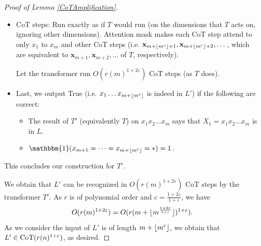 \documentclass{article}
\let\epsilon\varepsilon
\theoremstyle{definition}
\DeclarePairedDelimiter{\floor}{\lfloor}{\rfloor}
\newcommand{\x}{\mathbf{x}}
\newcommand{\0}{\mathbf{0}}
\newcommand{\CoT}{\mbox{\rm CoT}}
\newcommand{\1}{\mathbbm{1}}
\begin{document}
\begin{proof}[Proof of Lemma \ref{CoTAmplification}]
\begin{itemize}[noitemsep, leftmargin=10pt, topsep=0pt]
        \item CoT steps: Run exactly as if $T$ would run (on the dimensions that $T$ acts on, ignoring other dimensions). Attention mask makes each CoT step attend to only $x_1$ to $x_m$ and other CoT steps (i.e. $\x_{m+\floor{m^c}+1}, \x_{m+\floor{m^c}+2}, \dots$, which are equivalent to $\x_{m+1}, \x_{m+2}, \dots$ of $T$, respectively). 
        
        Let the transformer run $O(r(m)^{1 + 2 \epsilon})$ CoT steps (as $T$ does). 

        \item Last, we output True (i.e. $x_1 \dots x_{m + \floor{m^c}}$ is indeed in $L'$) if the following are correct: 
        \begin{itemize}
            \item The result of $T'$ (equivalently $T$) on $x_1 x_2 \dots x_m$ says that $X_1 = x_1 x_2 \dots x_m$ is in $L$. 
            \item $\1(x_{m+1} = \dots = x_{m+ \lfloor m^c \rfloor} = * ) = 1$. 
        \end{itemize}
    \end{itemize}
    This concludes our construction for $T'$. 

    We obtain that $L'$ can be recognized in $O(r(m)^{1+2\epsilon})$ CoT steps by the transformer $T'$. As $r$ is of polynomial order and $c = \frac{1 + 2\epsilon}{1 + \epsilon}$, we have  
    \begin{equation*}
        O(r(m)^{1+ 2\epsilon}) = O(r(m + \floor{m^{\frac{1+2\epsilon}{1 + \epsilon}}})^{1+\epsilon}). 
    \end{equation*}
    As we consider the input of $L'$ is of length $m + \floor{m^c}$, we obtain that $L' \in \CoT(r(n)^{1 + \epsilon})$, as desired. %

    


\end{proof}
\end{document}
